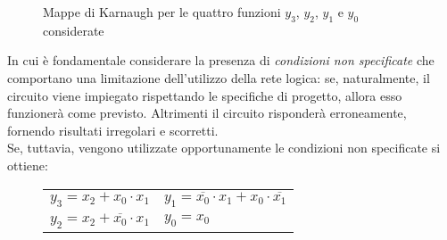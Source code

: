 \documentclass[a4paper]{extarticle}
\newcommand{\implicant}[4][0]{
    \draw[rounded corners=3pt, fill=#4, opacity=0.3] ($(#2.north west)+(135:#1)$) rectangle ($(#3.south east)+(-45:#1)$);
    }
\newcommand{\implicantcostats}[4][0]{
    \draw[rounded corners=3pt, fill=#4, opacity=0.3] ($(rf.east |- #2.north)+(90:#1)$)-| ($(#2.east)+(0:#1)$) |- ($(rf.east |- #3.south)+(-90:#1)$);
    \draw[rounded corners=3pt, fill=#4, opacity=0.3] ($(cf.west |- #2.north)+(90:#1)$) -| ($(#3.west)+(180:#1)$) |- ($(cf.west |- #3.south)+(-90:#1)$);
}
\newenvironment{KarnaughvuitFunction}%
{
\begin{tikzpicture}[baseline=(current bounding box.north),scale=0.8]
\draw (0,0) grid (4,2);
\draw (0,2) -- node [pos=0.9,above right,anchor=south west] {$x_2 x_1$} node [pos=0.7,below left,anchor=north east] {$x_0$} ++(135:1);
%
\matrix (mapa) [matrix of nodes,
        column sep={0.8cm,between origins},
        row sep={0.8cm,between origins},
        every node/.style={minimum size=0.3mm},
        anchor=4.center,
        ampersand replacement=\&] at (0.5,0.5)
{
                      \& |(c00)| $00$         \& |(c01)| $01$         \& |(c11)| $11$         \& |(c10)| $10$         \& |(cf)| \phantom{00} \\
|(r00)| $0$             \& |(0)|  \phantom{0} \& |(1)|  \phantom{0} \& |(3)|  \phantom{0} \& |(2)|  \phantom{0} \&                     \\
|(r01)| $1$             \& |(4)|  \phantom{0} \& |(5)|  \phantom{0} \& |(7)|  \phantom{0} \& |(6)|  \phantom{0} \&                     \\
|(rf) | \phantom{00}  \&                    \&                    \&                    \&                    \&                     \\
};
}%
{
\end{tikzpicture}
}
\newcommand{\contingut}[1]{%
\foreach \x [count=\xi from 0]  in {#1}
     \path (\xi) node {$\x$};
}
\begin{document}
\begin{figure}[H]
    \centering
    \caption{Mappe di Karnaugh per le quattro funzioni $y_3$, $y_2$, $y_1$ e $y_0$ considerate}
    \label{fig:mappe_karnaugh_quattro_funzioni}
\end{figure}

\noindent
In cui è fondamentale considerare la presenza di \emph{condizioni non specificate} che comportano una limitazione dell'utilizzo della rete logica: se, naturalmente, il circuito viene impiegato rispettando le specifiche di progetto, allora esso funzionerà come previsto. Altrimenti il circuito risponderà erroneamente, fornendo risultati irregolari e scorretti.\\
Se, tuttavia, vengono utilizzate opportunamente le condizioni non specificate si ottiene:

\begin{figure}[H]
  \centering
  \noindent
  \begin{tabular}{ll}
    $y_3 = x_2 + x_0 \cdot x_1$ & $y_1 = \overline{x_0} \cdot x_1 + x_0 \cdot \overline{x_1}$\\
    $y_2 = x_2 + \overline{x_0} \cdot x_1$ & $y_0 = x_0$
  \end{tabular}
\end{figure}
\end{document}
